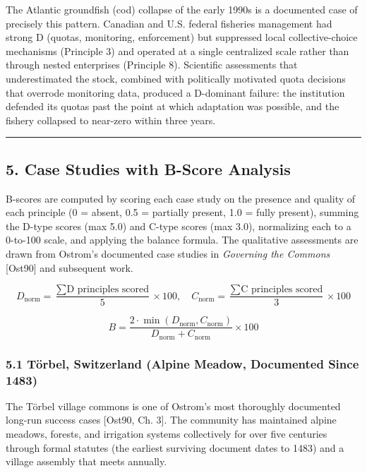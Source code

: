 \documentclass[
  11pt,
  letterpaper,
]{article}
\begin{document}
The Atlantic groundfish (cod) collapse of the early 1990s is a
documented case of precisely this pattern. Canadian and U.S. federal
fisheries management had strong D (quotas, monitoring, enforcement) but
suppressed local collective-choice mechanisms (Principle 3) and operated
at a single centralized scale rather than through nested enterprises
(Principle 8). Scientific assessments that underestimated the stock,
combined with politically motivated quota decisions that overrode
monitoring data, produced a D-dominant failure: the institution defended
its quotas past the point at which adaptation was possible, and the
fishery collapsed to near-zero within three years.

\begin{center}\rule{0.5\linewidth}{0.5pt}\end{center}

\subsection{5. Case Studies with B-Score
Analysis}\label{case-studies-with-b-score-analysis}

B-scores are computed by scoring each case study on the presence and
quality of each principle (0 = absent, 0.5 = partially present, 1.0 =
fully present), summing the D-type scores (max 5.0) and C-type scores
(max 3.0), normalizing each to a 0-to-100 scale, and applying the
balance formula. The qualitative assessments are drawn from Ostrom's
documented case studies in \emph{Governing the Commons} {[}Ost90{]} and
subsequent work.

\[D_{\text{norm}} = \frac{\sum \text{D principles scored}}{5} \times 100, \quad C_{\text{norm}} = \frac{\sum \text{C principles scored}}{3} \times 100\]

\[B = \frac{2 \cdot \min(D_{\text{norm}}, C_{\text{norm}})}{D_{\text{norm}} + C_{\text{norm}}} \times 100\]

\subsubsection{5.1 Törbel, Switzerland (Alpine Meadow, Documented Since
1483)}\label{tuxf6rbel-switzerland-alpine-meadow-documented-since-1483}

The Törbel village commons is one of Ostrom's most thoroughly documented
long-run success cases {[}Ost90, Ch. 3{]}. The community has maintained
alpine meadows, forests, and irrigation systems collectively for over
five centuries through formal statutes (the earliest surviving document
dates to 1483) and a village assembly that meets annually.
\end{document}
